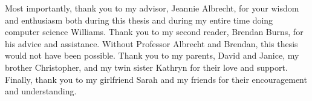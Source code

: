 Most importantly, thank you to my advisor, Jeannie Albrecht, for your wisdom and
enthusiasm both during this thesis and during my entire time doing computer
science Williams. Thank you to my second reader, Brendan Burns, for his advice
and assistance. Without Professor Albrecht and Brendan, this thesis would not
have been possible. Thank you to my parents, David and Janice, my brother
Christopher, and my twin sister Kathryn for their love and support. Finally, thank you to
my girlfriend Sarah and my friends for their encouragement and understanding.
